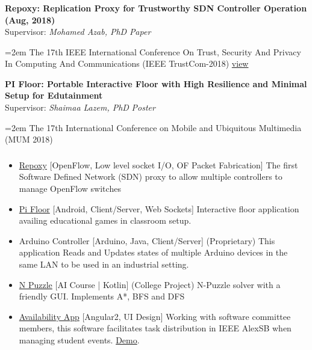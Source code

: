 \documentclass[paper=a4,fontsize=11pt]{scrartcl} %
\newcommand{\NewPart}[1]{\subsubsection{\color{AccentColor}{\textsc{#1}}}}
\newcommand{\ResearchEntry}[4]{
		\noindent \textbf{#1} \\      %
		\noindent Supervisor: \textit{#2} \hfill \textit{#3} \par         %
		\noindent\hangindent=2em\hangafter=0 \small #4 %
		\normalsize \par}
\begin{document}
\NewPart{Publications}{}
\ResearchEntry{Repoxy: Replication Proxy for Trustworthy SDN Controller Operation (Aug, 2018)}{Mohamed Azab, PhD}{Paper}{
	The 17th IEEE International Conference On Trust, Security And Privacy In Computing And Communications (IEEE TrustCom-2018) \href{https://ieeexplore.ieee.org/document/8455887/}{view}
}
\ResearchEntry{PI Floor: Portable Interactive Floor with High Resilience and Minimal Setup for Edutainment}{Shaimaa Lazem, PhD}{Poster}{
	The 17th International Conference on Mobile and Ubiquitous Multimedia (MUM 2018)
}
\NewPart{Projects}{}
\begin{itemize}
	\item \href{https://github.com/shakram02/Repoxy}{Repoxy} [OpenFlow, Low level socket I/O, OF Packet Fabrication] The first Software Defined Network (SDN) proxy to allow multiple controllers to manage OpenFlow switches
	\item \href{https://github.com/shakram02/PiFloor}{Pi Floor} [Android, Client/Server, Web Sockets] Interactive floor application availing educational games in classroom setup.
	\item Arduino Controller [Arduino, Java, Client/Server] (Proprietary) This application Reads and Updates states of multiple Arduino devices in the same LAN to be used in an industrial setting.

	\item \href{https://github.com/shakram02/Npuzzle-GUI}{N Puzzle} [AI Course | Kotlin] (College Project) N-Puzzle solver with a friendly GUI. Implements A*, BFS and DFS

	\item \href{https://github.com/alexsb-software/events-app}{Availability App} [Angular2, UI Design] Working with software committee members, this software facilitates task distribution in IEEE AlexSB when managing student events. \href{https://www.youtube.com/watch?v=ewxyfzxKQ8g}{Demo}.
\end{itemize}
\end{document}

